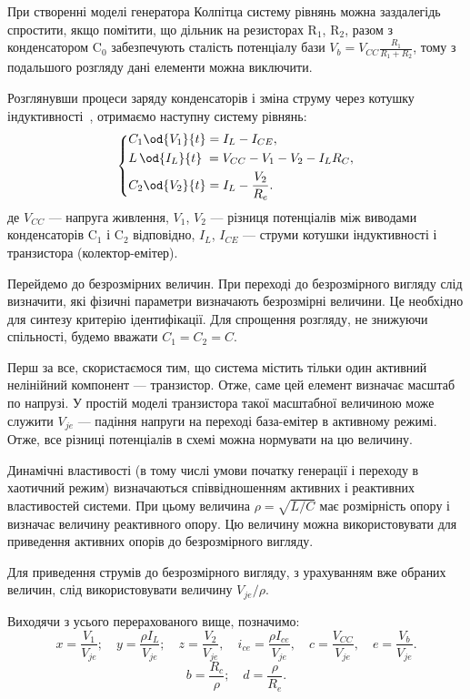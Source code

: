 При створенні моделі генератора Колпітца систему рівнянь можна
заздалегідь спростити, якщо помітити, що дільник на резисторах
$\mathrm{R}_1 $,
$\mathrm{R}_2 $, разом з конденсатором
$\mathrm{C}_0 $ забезпечують сталість потенціалу бази
$V_b = V_{CC} \frac{R_1}{R_1 + R_2} $, тому з подальшого розгляду дані елементи
можна виключити.

Розглянувши процеси заряду конденсаторів і зміна струму через
котушку індуктивності~\cite{zaeplnii_radio_calc}, отримаємо наступну
систему рівнянь:
%
\begin{equation}
\label{atu:eq:colp_phys}
\begin{dcases}
  C_1 \od{V_{1}}{t}  = I_L - I_{CE} , \\
  L\, \od{I_L}{t} \; = V_{CC} - V_{1} - V_{2} - I_L R_C , \\
  C_2 \od{V_{2}}{t}  = I_L - \frac{V_{2}}{R_e}.
\end{dcases}
\end{equation}
%
%
де
$ V_{CC} $ --- напруга живлення,
$ V_1 $, $ V_2 $ --- різниця потенціалів між виводами конденсаторів
$ \mathrm{C}_1 $ і
$ \mathrm{C}_2 $ відповідно,
$ I_L $,
$ I_{CE} $ --- струми котушки індуктивності і транзистора (колектор-емітер).


Перейдемо до безрозмірних величин. При переході до
безрозмірного вигляду слід визначити, які фізичні параметри
визначають безрозмірні величини. Це необхідно для синтезу
критерію ідентифікації. Для спрощення розгляду, не знижуючи
спільності, будемо вважати
$ C_1 = C_2 = C $.

Перш за все, скористаємося тим, що система містить тільки
один активний нелінійний компонент --- транзистор. Отже, саме
цей елемент визначає масштаб по напрузі. У простій моделі
транзистора такої масштабної величиною може служити
$ V_{je} $ --- падіння напруги на переході база-емітер в активному
режимі. Отже, все різниці потенціалів в схемі можна нормувати
на цю величину.

Динамічні властивості (в тому числі умови початку генерації
і переходу в хаотичний режим) визначаються співвідношенням
активних і реактивних властивостей системи. При цьому величина
$ \rho = \sqrt{L/C} $ має розмірність опору і визначає величину
реактивного опору. Цю величину можна використовувати для
приведення активних опорів до безрозмірного вигляду.

Для приведення струмів до безрозмірного вигляду, з урахуванням
вже обраних величин, слід використовувати величину
$ V_{je} / \rho $.


Виходячи з усього перерахованого вище, позначимо:
%
\[
  x = \frac{V_{1}}{V_{je}} ; \quad
  y = \frac{\rho I_L}{V_{je}} ; \quad
  z = \frac{V_{2}}{V_{je}}, \quad
  i_{ce} = \frac{\rho I_{ce}}{V_{je}}, \quad
  c = \frac{V_{CC}}{V_{je}}, \quad
  e = \frac{V_{b}}{V_{je}}.
\]
%
\[
  b = \frac{R_c}{\rho}; \quad
  d = \frac{\rho}{R_e}. %
\]

